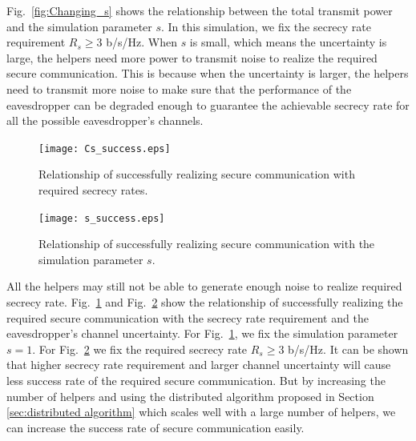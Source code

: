 \documentclass[journal]{IEEEtran}
\begin{document}
Fig.~\ref{fig:Changing_s} shows  the relationship between the total transmit power and the simulation parameter $s$. In this simulation, we fix the secrecy rate requirement $R_s \geq 3 $ b/s/Hz. When $s$ is small, which means the uncertainty is large, the helpers need more power to transmit noise to realize the required secure communication. This is because when the uncertainty is larger, the helpers need to transmit more noise to make sure that the performance of the eavesdropper can be degraded enough to guarantee the achievable secrecy rate for all the possible eavesdropper's channels.

\begin{figure}[!ht]
	\centering
	\texttt{[image: Cs\_success.eps]} %
	\caption{Relationship of successfully realizing secure communication with required secrecy rates.}
	\label{fig:Cs_success}
\end{figure}
\begin{figure}[!ht]
	\centering
	\texttt{[image: s\_success.eps]} %
	\caption{Relationship of successfully realizing secure communication with the simulation parameter $s$.}
	\label{fig:s_success}
\end{figure}

All the helpers may still not be able to generate enough noise to realize required secrecy rate. Fig.~\ref{fig:Cs_success} and Fig.~\ref{fig:s_success} show the relationship of successfully realizing the required secure communication with the secrecy rate requirement and the eavesdropper's channel uncertainty. For Fig.~\ref{fig:Cs_success}, we fix the simulation parameter $s = 1$. For Fig.~\ref{fig:s_success} we fix the required secrecy rate $R_s \geq 3$ b/s/Hz. It can be shown that higher secrecy rate requirement and larger channel uncertainty will cause less success rate of the required secure communication. But by increasing the number of helpers and using the distributed algorithm proposed in Section \ref{sec:distributed algorithm} which scales well with a large number of helpers, we can increase the success rate of secure communication easily. 

%
%
\end{document}
